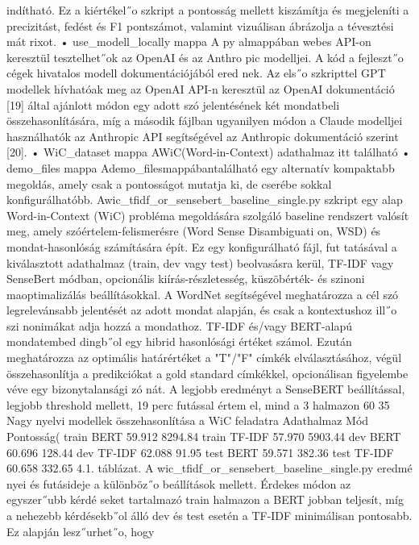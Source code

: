 \documentclass[12pt]{report}
\theoremstyle{definition}
\begin{document}
 indítható. Ez a kiértékel˝o szkript a pontosság mellett kiszámítja és megjeleníti a
 precizitást, fedést és F1 pontszámot, valamint vizuálisan ábrázolja a tévesztési mát
rixot.
 • use_modell_locally mappa
 A py almappában webes API-on keresztül tesztelhet˝ok az OpenAI és az Anthro
pic modelljei. A kód a fejleszt˝o cégek hivatalos modell dokumentációjából ered
nek. Az els˝o szkripttel GPT modellek hívhatóak meg az OpenAI API-n keresztül
 az OpenAI dokumentáció [19] által ajánlott módon egy adott szó jelentésének két
 mondatbeli összehasonlítására, míg a második fájlban ugyanilyen módon a Claude
 modelljei használhatók az Anthropic API segítségével az Anthropic dokumentáció
 szerint [20].
 • WiC_dataset mappa
 AWiC(Word-in-Context) adathalmaz itt található
 • demo_files mappa
 Ademo_filesmappábantalálható egy alternatív kompaktabb megoldás, amely csak
 a pontosságot mutatja ki, de cserébe sokkal konfigurálhatóbb.
 Awic_tfidf_or_sensebert_baseline_single.py
 szkript egy alap Word-in-Context (WiC) probléma megoldására szolgáló baseline
 rendszert valósít meg, amely szóértelem-felismerésre (Word Sense Disambiguati
on, WSD) és mondat-hasonlóság számítására épít. Ez egy konfigurálható fájl, fut
tatásával a kiválasztott adathalmaz (train, dev vagy test) beolvasásra kerül, TF-IDF
 vagy SenseBert módban, opcionális kiírás-részletesség, küszöbérték- és szinoni
maoptimalizálás beállításokkal. A WordNet segítségével meghatározza a cél szó
 legrelevánsabb jelentését az adott mondat alapján, és csak a kontextushoz ill˝o szi
nonimákat adja hozzá a mondathoz. TF-IDF és/vagy BERT-alapú mondatembed
dingb˝ol egy hibrid hasonlósági értéket számol. Ezután meghatározza az optimális
 határértéket a "T"/"F" címkék elválasztásához, végül összehasonlítja a predikciókat
 a gold standard címkékkel, opcionálisan figyelembe véve egy bizonytalansági zó
nát. A legjobb eredményt a SenseBERT beállítással, legjobb threshold mellett, 19
 perc futással értem el, mind a 3 halmazon 60%
 35
Nagy nyelvi modellek összehasonlítása a WiC feladatra
 Adathalmaz
 Mód Pontosság(%
 train
 BERT
 59.912
 8294.84
 train
 TF-IDF
 57.970
 5903.44
 dev
 BERT
 60.696
 128.44
 dev
 TF-IDF
 62.088
 91.95
 test
 BERT
 59.571
 382.36
 test
 TF-IDF
 60.658
 332.65
 4.1. táblázat. A wic_tfidf_or_sensebert_baseline_single.py eredmé
nyei és futásideje a különböz˝o beállítások mellett. Érdekes módon az egyszer˝ubb kérdé
seket tartalmazó train halmazon a BERT jobban teljesít, míg a nehezebb kérdésekb˝ol
 álló dev és test esetén a TF-IDF minimálisan pontosabb. Ez alapján lesz˝urhet˝o, hogy
\end{document}
